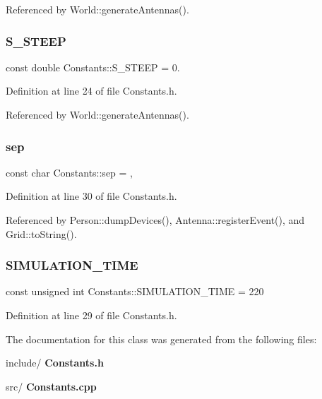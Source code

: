 Referenced by World\+::generate\+Antennas().

\mbox{\label{class_constants_aca0663372011df124d15a4c0ddb98843}} 
\subsubsection{S\+\_\+\+S\+T\+E\+EP}
{\footnotesize\ttfamily const double Constants\+::\+S\+\_\+\+S\+T\+E\+EP = 0.\hspace{0.3cm}{\ttfamily [static]}}



Definition at line 24 of file Constants.\+h.



Referenced by World\+::generate\+Antennas().

\mbox{\label{class_constants_afc927f63cc5fbb912114d6b0f28b8b4f}} 
\subsubsection{sep}
{\footnotesize\ttfamily const char Constants\+::sep = \textquotesingle{},\textquotesingle{}\hspace{0.3cm}{\ttfamily [static]}}



Definition at line 30 of file Constants.\+h.



Referenced by Person\+::dump\+Devices(), Antenna\+::register\+Event(), and Grid\+::to\+String().

\mbox{\label{class_constants_a33b3b1a16fcbe0d87910e72a370dc446}} 
\subsubsection{S\+I\+M\+U\+L\+A\+T\+I\+O\+N\+\_\+\+T\+I\+ME}
{\footnotesize\ttfamily const unsigned int Constants\+::\+S\+I\+M\+U\+L\+A\+T\+I\+O\+N\+\_\+\+T\+I\+ME = 220\hspace{0.3cm}{\ttfamily [static]}}



Definition at line 29 of file Constants.\+h.



The documentation for this class was generated from the following files\+:\begin{DoxyCompactItemize}
\item 
include/\textbf{ Constants.\+h}\item 
src/\textbf{ Constants.\+cpp}\end{DoxyCompactItemize}
